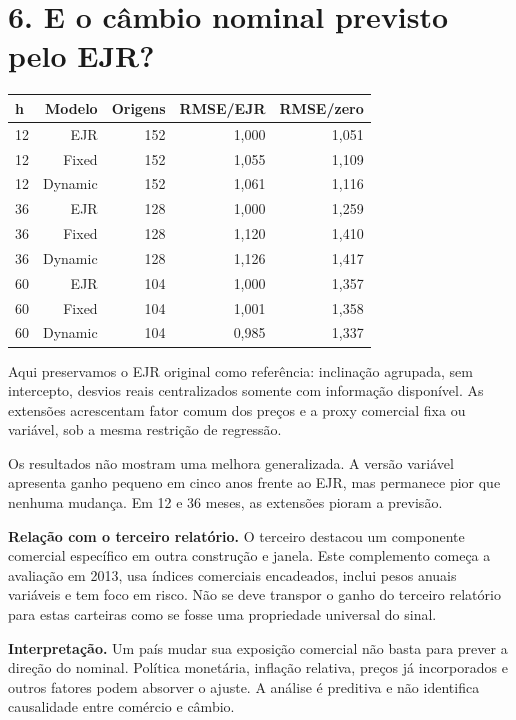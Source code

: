 \documentclass[11pt,a4paper]{article}
\begin{document}
\section*{6. E o câmbio nominal previsto pelo EJR?}
\small\begin{center}\begin{tabular}{lrrrr}\toprule h & Modelo & Origens & RMSE/EJR & RMSE/zero\\\midrule 
12 & EJR & 152 & 1,000 & 1,051\\
12 & Fixed & 152 & 1,055 & 1,109\\
12 & Dynamic & 152 & 1,061 & 1,116\\
36 & EJR & 128 & 1,000 & 1,259\\
36 & Fixed & 128 & 1,120 & 1,410\\
36 & Dynamic & 128 & 1,126 & 1,417\\
60 & EJR & 104 & 1,000 & 1,357\\
60 & Fixed & 104 & 1,001 & 1,358\\
60 & Dynamic & 104 & 0,985 & 1,337\\\bottomrule\end{tabular}\end{center}\normalsize

Aqui preservamos o EJR original como referência: inclinação agrupada, sem intercepto, desvios reais centralizados somente com informação disponível. As extensões acrescentam fator comum dos preços e a proxy comercial fixa ou variável, sob a mesma restrição de regressão.

Os resultados não mostram uma melhora generalizada. A versão variável apresenta ganho pequeno em cinco anos frente ao EJR, mas permanece pior que nenhuma mudança. Em 12 e 36 meses, as extensões pioram a previsão.

\textbf{Relação com o terceiro relatório.} O terceiro destacou um componente comercial específico em outra construção e janela. Este complemento começa a avaliação em 2013, usa índices comerciais encadeados, inclui pesos anuais variáveis e tem foco em risco. Não se deve transpor o ganho do terceiro relatório para estas carteiras como se fosse uma propriedade universal do sinal.

\textbf{Interpretação.} Um país mudar sua exposição comercial não basta para prever a direção do nominal. Política monetária, inflação relativa, preços já incorporados e outros fatores podem absorver o ajuste. A análise é preditiva e não identifica causalidade entre comércio e câmbio.

\clearpage
\end{document}
